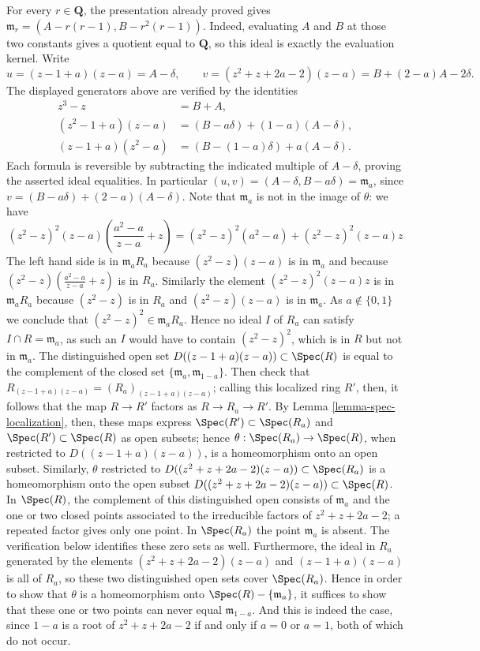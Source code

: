 \begin{example}
$$$$
For every $r\in\mathbf Q$, the presentation already proved gives
$\mathfrak m_r=(A-r(r-1),B-r^2(r-1))$.
Indeed, evaluating $A$ and $B$ at those two constants gives a quotient
equal to $\mathbf Q$, so this ideal is exactly the evaluation kernel.
Write
$$
u=(z-1+a)(z-a)=A-\delta,\qquad
v=(z^2+z+2a-2)(z-a)=B+(2-a)A-2\delta.
$$
The displayed generators above are verified by the identities
$$
\begin{aligned}
z^3-z&=B+A,\\
(z^2-1+a)(z-a)&=(B-a\delta)+(1-a)(A-\delta),\\
(z-1+a)(z^2-a)&=(B-(1-a)\delta)+a(A-\delta).
\end{aligned}
$$
Each formula is reversible by subtracting the indicated multiple
of $A-\delta$, proving the asserted ideal equalities.
In particular $(u,v)=(A-\delta,B-a\delta)=\mathfrak m_a$,
since $v=(B-a\delta)+(2-a)(A-\delta)$.
Note that
$\mathfrak{m}_a$ is not in the image of $\theta$: we have
$$
(z^2 - z)^2(z - a)\left(\frac{a^2 - a}{z - a} + z\right) =
(z^2 - z)^2(a^2 - a) + (z^2 - z)^2(z - a)z
$$
The left hand side is in $\mathfrak m_a R_a$ because
$(z^2 - z)(z - a)$ is in $\mathfrak m_a$ and because
$(z^2 - z)(\frac{a^2 - a}{z - a} + z)$ is in $R_a$. Similarly
the element $(z^2 - z)^2(z - a)z$ is in $\mathfrak m_a R_a$
because $(z^2 - z)$ is in $R_a$ and $(z^2 - z)(z - a)$ is in $\mathfrak m_a$.
As $a \not \in \{0, 1\}$ we conclude that
$(z^2 - z)^2 \in \mathfrak m_a R_a$. Hence
no ideal $I$ of $R_a$ can satisfy $I \cap R = \mathfrak m_a$, as such
an $I$ would have to contain $(z^2 - z)^2$, which is in $R$ but not in
$\mathfrak m_a$. The distinguished open set
$D((z-1 + a)(z-a))\subset\Spec(R)$ is equal to the complement of
the closed set $\{\mathfrak{m}_a, \mathfrak{m}_{1-a}\}$.
Then check that $R_{(z-1 + a)(z-a)} = (R_a)_{(z-1 + a)(z-a)}$; calling
this localized ring $R'$, then, it follows that the map $R \to R'$
factors as $R \to R_a \to R'$.  By Lemma
\ref{lemma-spec-localization}, then, these maps express
$\Spec(R') \subset \Spec(R_a)$ and
$\Spec(R') \subset \Spec(R)$ as open subsets; hence
$\theta : \Spec(R_a) \to \Spec(R)$, when restricted to
$D((z-1 + a)(z-a))$, is a homeomorphism onto an open subset.
Similarly, $\theta$ restricted to
$D((z^2 + z + 2a-2)(z-a)) \subset \Spec(R_a)$ is a homeomorphism
onto the open subset $D((z^2 + z + 2a-2)(z-a)) \subset \Spec(R)$.
In $\Spec(R)$, the complement of this distinguished open consists
of $\mathfrak m_a$ and the one or two closed points associated to the
irreducible factors of $z^2+z+2a-2$; a repeated factor gives only one point.
In $\Spec(R_a)$ the point $\mathfrak m_a$ is absent.
The verification below identifies these zero sets as well.
Furthermore, the ideal in $R_a$ generated by the
elements $(z^2 + z + 2a-2)(z-a)$ and $(z-1 + a)(z-a)$ is all of $R_a$, so
these two distinguished open sets cover $\Spec(R_a)$. Hence in
order to show that $\theta$ is a homeomorphism onto
$\Spec(R)-\{\mathfrak{m}_a\}$, it suffices to show
that these one or two points can never equal $\mathfrak{m}_{1-a}$.
And this is indeed the case, since $1-a$ is a root of $z^2 + z + 2a-2$
if and only if $a = 0$ or $a = 1$, both of which do not occur.


\end{example}
